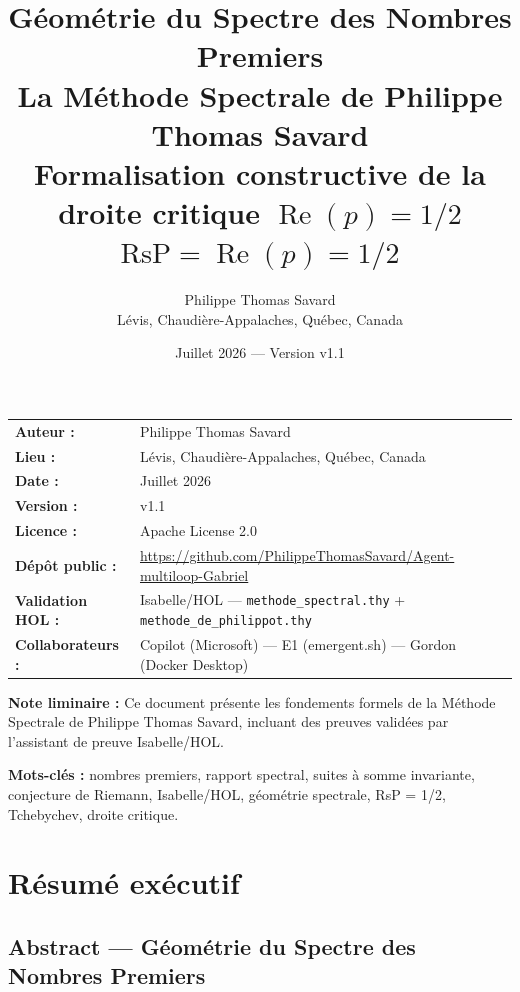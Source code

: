 \documentclass[11pt,a4paper]{article}
\title{\textbf{Géométrie du Spectre des Nombres Premiers}\\[0.4em]
       \Large La Méthode Spectrale de Philippe Thomas Savard\\[0.3em]
       \normalsize Formalisation constructive de la droite critique $\operatorname{Re}(p) = 1/2$\\[0.2em]
       \normalsize $\boxed{\text{RsP} = \operatorname{Re}(p) = 1/2}$}
\author{Philippe Thomas Savard\\
        \small Lévis, Chaudière-Appalaches, Québec, Canada}
\date{Juillet 2026 — Version v1.1}
\begin{document}
\maketitle

\begin{center}
\begin{tabular}{ll}
\textbf{Auteur :}         & Philippe Thomas Savard \\
\textbf{Lieu :}           & Lévis, Chaudière-Appalaches, Québec, Canada \\
\textbf{Date :}           & Juillet 2026 \\
\textbf{Version :}        & v1.1 \\
\textbf{Licence :}        & Apache License 2.0 \\
\textbf{Dépôt public :}   & \url{https://github.com/PhilippeThomasSavard/Agent-multiloop-Gabriel} \\
\textbf{Validation HOL :} & Isabelle/HOL --- \texttt{methode\_spectral.thy} + \texttt{methode\_de\_philippot.thy} \\
\textbf{Collaborateurs :} & Copilot (Microsoft) --- E1 (emergent.sh) --- Gordon (Docker Desktop) \\
\end{tabular}
\end{center}

\bigskip
\noindent\textbf{Note liminaire :} Ce document présente les fondements formels de la Méthode Spectrale de Philippe Thomas Savard, incluant des preuves validées par l'assistant de preuve Isabelle/HOL.

\bigskip
\noindent\textbf{Mots-clés :} nombres premiers, rapport spectral, suites à somme invariante, conjecture de Riemann, Isabelle/HOL, géométrie spectrale, RsP = 1/2, Tchebychev, droite critique.

\newpage

\section*{Résumé exécutif}

\subsection*{Abstract — Géométrie du Spectre des Nombres Premiers}
\end{document}
